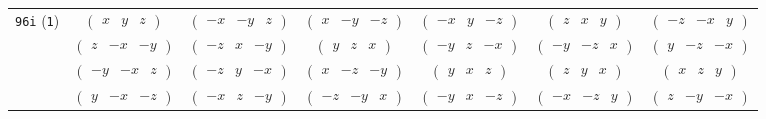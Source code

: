 \documentclass[fleqn,9pt,landscape]{jsarticle}
\begin{document}
\begin{center}
\begin{longtable}{ccccccc}
{\tt 96i} ({\tt 1}) & $ \begin{pmatrix} x & y & z \end{pmatrix} $ & $ \begin{pmatrix} - x & - y & z \end{pmatrix} $ & $ \begin{pmatrix} x & - y & - z \end{pmatrix} $ & $ \begin{pmatrix} - x & y & - z \end{pmatrix} $ & $ \begin{pmatrix} z & x & y \end{pmatrix} $ & $ \begin{pmatrix} - z & - x & y \end{pmatrix} $ \\
& $ \begin{pmatrix} z & - x & - y \end{pmatrix} $ & $ \begin{pmatrix} - z & x & - y \end{pmatrix} $ & $ \begin{pmatrix} y & z & x \end{pmatrix} $ & $ \begin{pmatrix} - y & z & - x \end{pmatrix} $ & $ \begin{pmatrix} - y & - z & x \end{pmatrix} $ & $ \begin{pmatrix} y & - z & - x \end{pmatrix} $ \\
& $ \begin{pmatrix} - y & - x & z \end{pmatrix} $ & $ \begin{pmatrix} - z & y & - x \end{pmatrix} $ & $ \begin{pmatrix} x & - z & - y \end{pmatrix} $ & $ \begin{pmatrix} y & x & z \end{pmatrix} $ & $ \begin{pmatrix} z & y & x \end{pmatrix} $ & $ \begin{pmatrix} x & z & y \end{pmatrix} $ \\
& $ \begin{pmatrix} y & - x & - z \end{pmatrix} $ & $ \begin{pmatrix} - x & z & - y \end{pmatrix} $ & $ \begin{pmatrix} - z & - y & x \end{pmatrix} $ & $ \begin{pmatrix} - y & x & - z \end{pmatrix} $ & $ \begin{pmatrix} - x & - z & y \end{pmatrix} $ & $ \begin{pmatrix} z & - y & - x \end{pmatrix} $ \\

\end{longtable}
\end{center}
\end{document}
